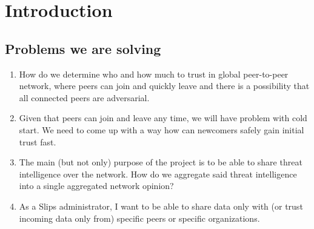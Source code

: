 \chapter{Introduction}
\label{ch:introduction}



\section{Problems we are solving}
\begin{enumerate}
\item How do we determine who and how much to trust in global peer-to-peer network, where peers can join and quickly leave and there is a possibility that all connected peers are adversarial.
\item Given that peers can join and leave any time, we will have problem with cold start. We need to come up with a way how can newcomers safely gain initial trust fast.
\item The main (but not only) purpose of the project is to be able to share threat intelligence over the network. How do we aggregate said threat intelligence into a single aggregated network opinion?
\item As a Slips administrator, I want to be able to share data only with (or trust incoming data only from) specific peers or specific organizations.
\end{enumerate}